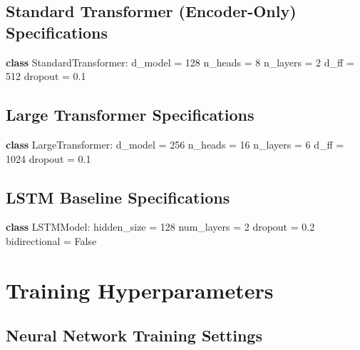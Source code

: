 \documentclass[11pt]{article}
\begin{document}
\subsection{Standard Transformer (Encoder-Only) Specifications}

\begin{algorithmic}
\STATE \textbf{class} StandardTransformer:
\STATE \quad d\_model = 128 
\STATE \quad n\_heads = 8 
\STATE \quad n\_layers = 2 
\STATE \quad d\_ff = 512 
\STATE \quad dropout = 0.1 
\STATE {}
\end{algorithmic}

\subsection{Large Transformer Specifications}

\begin{algorithmic}
\STATE \textbf{class} LargeTransformer:
\STATE \quad d\_model = 256 
\STATE \quad n\_heads = 16 
\STATE \quad n\_layers = 6 
\STATE \quad d\_ff = 1024 
\STATE \quad dropout = 0.1 
\STATE {}
\end{algorithmic}

\subsection{LSTM Baseline Specifications}

\begin{algorithmic}
\STATE \textbf{class} LSTMModel:
\STATE \quad hidden\_size = 128 
\STATE \quad num\_layers = 2 
\STATE \quad dropout = 0.2 
\STATE \quad bidirectional = False 
\STATE {}
\end{algorithmic}

\section{Training Hyperparameters}

\subsection{Neural Network Training Settings}
\end{document}
